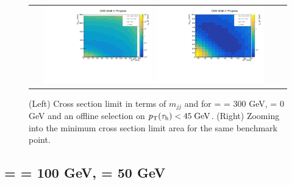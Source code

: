 \begin{figure}[tbh!]
	\centering
	\begin{tabular}{cc}
		\includegraphics[width=0.45\textwidth]{analysis/pics/JetInvMass_vs_MET_xsec_chi300_lsp000_taupt45.pdf}
		\includegraphics[width=0.45\textwidth]{analysis/pics/JetInvMass_vs_MET_xsec_chi300_lsp000_taupt45_zoom.pdf} 		
	\end{tabular}
	\caption{(Left) Cross section limit in terms of $m_{jj}$ and \met for \charginopm = \neutralinotwo = 300 GeV, \neutralinoone = 0 GeV and an offline selection on $p_{\text{T}}(\tau_{\text{h}}) <  45\;\text{Ge}\kern-0.06667em\text{V}$. (Right) Zooming into the minimum cross section limit area for the same benchmark point.}
	\label{fig::JetInvMass_vs_MET_xsec_chi300_lsp000_taupt45}
\end{figure}

\clearpage

\subsection*{\charginopm = \neutralinotwo = 100 GeV, \neutralinoone = 50 GeV}

